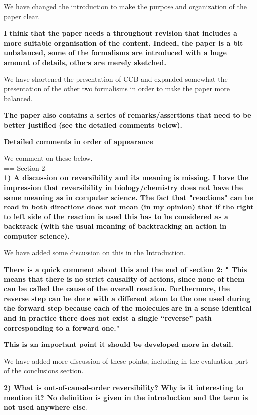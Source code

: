 \documentclass{article}
\begin{document}
We have changed the introduction to make the purpose and organization of the paper clear.

\textbf{I think that the paper needs a throughout revision that includes a more suitable organisation of the content. Indeed, the paper is a bit unbalanced, some of the formalisms are introduced with a huge amount of details, others are merely sketched.}

We have shortened the presentation of CCB and expanded somewhat the presentation of the other two formalisms
in order to make the paper more balanced.

\textbf{The paper also contains a series of remarks/assertions that need to be better justified (see the detailed comments below).}

\textbf{Detailed comments in order of appearance}

We comment on these below.\\

== Section 2\\

\textbf{1) A discussion on reversibility and its meaning is missing. 
I have the impression that reversibility in biology/chemistry does not have the same meaning as in computer science. The fact that "reactions" can be read in both directions does not mean (in my opinion) that if the right to left side of the reaction is used this has to be considered as a backtrack (with the usual meaning of backtracking an action in computer science).}

We have added some discussion on this in the Introduction.

\textbf{There is a quick comment about this and the end of section 2: " This means that there is no strict causality of actions, since none of them can be called the cause of the overall reaction. Furthermore, the reverse step can be done with a different atom to the one used during the forward step because each of the molecules are in a sense identical and in practice there does not exist a single “reverse” path corresponding to a forward one."}

\textbf{This is an important point it should be developed more in detail. }

We have added more discussion of these points, including in the evaluation part of the conclusions section.

\textbf{2) What is out-of-causal-order reversibility? Why is it interesting to mention it? No definition is given in the introduction and the term is not used anywhere else.}
\end{document}
